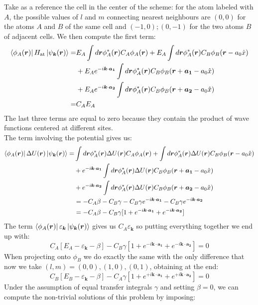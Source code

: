 \documentclass[10.75pt,a4paper,openright,bottom=2cm]{article}
\renewcommand{\Vec}[1]{\boldsymbol{#1}}
\begin{document}
Take as a reference the cell in the center of the scheme: for the atom labeled with $A$, the possible values of $l$ and $m$ connecting nearest neighbours are $(0,0)$ for the atoms $A$ and $B$ of the same cell and $(-1,0);(0,-1)$ for the two atoms $B$ of adjacent cells. We then compute the first term:
\begin{align*}
\bra{\phi_A(\Vec{r})}H_{\text{at}}\ket{\psi_{\Vec{k}}(\Vec{r})}=&E_A\int d\Vec{r}\phi_A^*(\Vec{r})C_A\phi_A(\Vec{r})+E_A\int d\Vec{r}\phi_A^*(\Vec{r})C_B\phi_B(\Vec{r}-a_0\hat{x})\\
&+E_Ae^{-i\Vec{k}\cdot\Vec{a_1}}\int d\Vec{r}\phi_A^*(\Vec{r})C_B\phi_B(\Vec{r}+\Vec{a_1}-a_0\hat{x})\\
&+E_Ae^{-i\Vec{k}\cdot\Vec{a_2}}\int d\Vec{r}\phi_A^*(\Vec{r})C_B\phi_B(\Vec{r}+\Vec{a_2}-a_0\hat{x})\\
=&C_AE_A
\end{align*}
The last three terms are equal to zero because they contain the product of wave functions centered at different sites.\\
The term involving the potential gives us:
\begin{align*}
\bra{\phi_A(\Vec{r})}\Delta U(\Vec{r})\ket{\psi_{\Vec{k}}(\Vec{r})}=&\int d\Vec{r}\phi_A^*(\Vec{r})\Delta U(\Vec{r})C_A\phi_A(\Vec{r})+\int d\Vec{r}\phi_A^*(\Vec{r})\Delta U(\Vec{r})C_B\phi_B(\Vec{r}-a_0\hat{x})\\
&+e^{-i\Vec{k}\cdot\Vec{a_1}}\int d\Vec{r}\phi_A^*(\Vec{r})\Delta U(\Vec{r})C_B\phi_B(\Vec{r}+\Vec{a_1}-a_0\hat{x})\\
&+e^{-i\Vec{k}\cdot\Vec{a_2}}\int d\Vec{r}\phi_A^*(\Vec{r})\Delta U(\Vec{r})C_B\phi_B(\Vec{r}+\Vec{a_2}-a_0\hat{x})\\
&=-C_A\beta-C_B\gamma-C_B\gamma e^{-i\Vec{k}\cdot\Vec{a_1}}-C_B\gamma e^{-i\Vec{k}\cdot\Vec{a_2}}\\
&=-C_A\beta-C_B\gamma[1+e^{-i\Vec{k}\cdot\Vec{a_1}}+e^{-i\Vec{k}\cdot\Vec{a_2}}]
\end{align*}
The term $\bra{\phi_A(\Vec{r})}\varepsilon_{\Vec{k}}\ket{\psi_{\Vec{k}}(\Vec{r})}$ gives us $C_A\varepsilon_{\Vec{k}}$ so putting everything together we end up with:
\[
C_A[E_A-\varepsilon_{\Vec{k}}-\beta]-C_B\gamma[1+e^{-i\Vec{k}\cdot\Vec{a_1}}+e^{-i\Vec{k}\cdot\Vec{a_2}}]=0
\]
When projecting onto $\phi_B$ we do exactly the same with the only difference that now we take $(l,m)=(0,0),(1,0),(0,1)$, obtaining at the end:
\[
C_B[E_B-\varepsilon_{\Vec{k}}-\beta]-C_A\gamma[1+e^{+i\Vec{k}\cdot\Vec{a_1}}+e^{+i\Vec{k}\cdot\Vec{a_2}}]=0
\]
Under the assumption of equal transfer integrals $\gamma$ and setting $\beta=0$, we can compute the non-trivial solutions of this problem by imposing:
\end{document}
